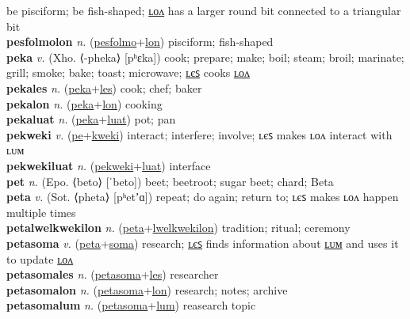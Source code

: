 be pisciform; be fish-shaped; \hyperref[pesfolmolon]{ʟᴏᴧ} has a larger round bit connected to a triangular bit \label{pesfolmo} \\
\textbf{pesfolmolon} \textit{n.} (\hyperref[pesfolmo]{pesfolmo}+\hyperref[lon]{lon})
pisciform; fish-shaped \label{pesfolmolon} \\
\textbf{peka} \textit{v.} (Xho. ⟨-pheka⟩ [pʰɛka])
cook; prepare; make; boil; steam; broil; marinate; grill; smoke; bake; toast; microwave; \hyperref[pekales]{ʟєꜱ} cooks \hyperref[pekalon]{ʟᴏᴧ} \label{peka} \\
\textbf{pekales} \textit{n.} (\hyperref[peka]{peka}+\hyperref[les]{les})
cook; chef; baker \label{pekales} \\
\textbf{pekalon} \textit{n.} (\hyperref[peka]{peka}+\hyperref[lon]{lon})
cooking \label{pekalon} \\
\textbf{pekaluat} \textit{n.} (\hyperref[peka]{peka}+\hyperref[luat]{luat})
pot; pan \label{pekaluat} \\
\textbf{pekweki} \textit{v.} (\hyperref[pe]{pe}+\hyperref[kweki]{kweki})
interact; interfere; involve; ʟєꜱ makes ʟᴏᴧ interact with ʟᴜᴍ \label{pekweki} \\
\textbf{pekwekiluat} \textit{n.} (\hyperref[pekweki]{pekweki}+\hyperref[luat]{luat})
interface \label{pekwekiluat} \\
\textbf{pet} \textit{n.} (Epo. ⟨beto⟩ [ˈbeto])
beet; beetroot; sugar beet; chard; Beta \label{pet} \\
\textbf{peta} \textit{v.} (Sot. ⟨pheta⟩ [pʰetʼɑ])
repeat; do again; return to; ʟєꜱ makes ʟᴏᴧ happen multiple times \label{peta} \\
\textbf{petalwelkwekilon} \textit{n.} (\hyperref[peta]{peta}+\hyperref[lwelkwekilon]{lwelkwekilon})
tradition; ritual; ceremony \label{petalwelkwekilon} \\
\textbf{petasoma} \textit{v.} (\hyperref[peta]{peta}+\hyperref[soma]{soma})
research; \hyperref[petasomales]{ʟєꜱ} finds information about \hyperref[petasomalum]{ʟᴜᴍ} and uses it to update \hyperref[petasomalon]{ʟᴏᴧ} \label{petasoma} \\
\textbf{petasomales} \textit{n.} (\hyperref[petasoma]{petasoma}+\hyperref[les]{les})
researcher \label{petasomales} \\
\textbf{petasomalon} \textit{n.} (\hyperref[petasoma]{petasoma}+\hyperref[lon]{lon})
research; notes; archive \label{petasomalon} \\
\textbf{petasomalum} \textit{n.} (\hyperref[petasoma]{petasoma}+\hyperref[lum]{lum})
reasearch topic \label{petasomalum} \\
